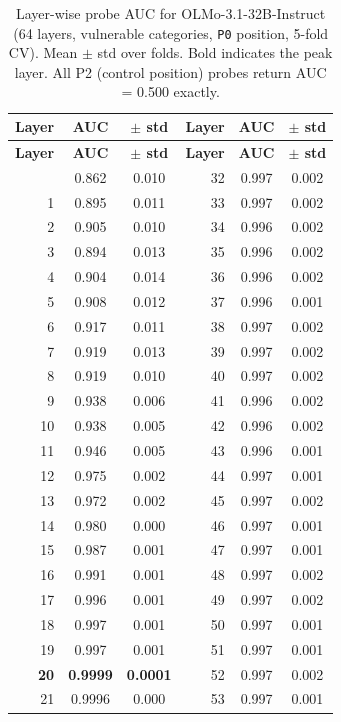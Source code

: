 \documentclass{article}
\newcommand{\pzero}{\texttt{P0}}
\begin{document}
\begin{longtable}{rcc|rcc}
\caption{Layer-wise probe AUC for OLMo-3.1-32B-Instruct (64 layers,
  vulnerable categories, \pzero{} position, 5-fold CV).
  Mean $\pm$ std over folds.  Bold indicates the peak layer.
  All P2 (control position) probes return AUC = 0.500 exactly.}
\label{tab:scale_probe_layers} \\
\toprule
\textbf{Layer} & \textbf{AUC} & \textbf{$\pm$ std} &
\textbf{Layer} & \textbf{AUC} & \textbf{$\pm$ std} \\
\midrule
\endfirsthead
\toprule
\textbf{Layer} & \textbf{AUC} & \textbf{$\pm$ std} &
\textbf{Layer} & \textbf{AUC} & \textbf{$\pm$ std} \\
\midrule
\endhead
\bottomrule
\endfoot
 0 & 0.862 & 0.010 & 32 & 0.997 & 0.002 \\
 1 & 0.895 & 0.011 & 33 & 0.997 & 0.002 \\
 2 & 0.905 & 0.010 & 34 & 0.996 & 0.002 \\
 3 & 0.894 & 0.013 & 35 & 0.996 & 0.002 \\
 4 & 0.904 & 0.014 & 36 & 0.996 & 0.002 \\
 5 & 0.908 & 0.012 & 37 & 0.996 & 0.001 \\
 6 & 0.917 & 0.011 & 38 & 0.997 & 0.002 \\
 7 & 0.919 & 0.013 & 39 & 0.997 & 0.002 \\
 8 & 0.919 & 0.010 & 40 & 0.997 & 0.002 \\
 9 & 0.938 & 0.006 & 41 & 0.996 & 0.002 \\
10 & 0.938 & 0.005 & 42 & 0.996 & 0.002 \\
11 & 0.946 & 0.005 & 43 & 0.996 & 0.001 \\
12 & 0.975 & 0.002 & 44 & 0.997 & 0.001 \\
13 & 0.972 & 0.002 & 45 & 0.997 & 0.002 \\
14 & 0.980 & 0.000 & 46 & 0.997 & 0.001 \\
15 & 0.987 & 0.001 & 47 & 0.997 & 0.001 \\
16 & 0.991 & 0.001 & 48 & 0.997 & 0.002 \\
17 & 0.996 & 0.001 & 49 & 0.997 & 0.002 \\
18 & 0.997 & 0.001 & 50 & 0.997 & 0.001 \\
19 & 0.997 & 0.001 & 51 & 0.997 & 0.001 \\
\textbf{20} & \textbf{0.9999} & \textbf{0.0001} & 52 & 0.997 & 0.002 \\
21 & 0.9996 & 0.000 & 53 & 0.997 & 0.001 \\

\end{longtable}
\end{document}
